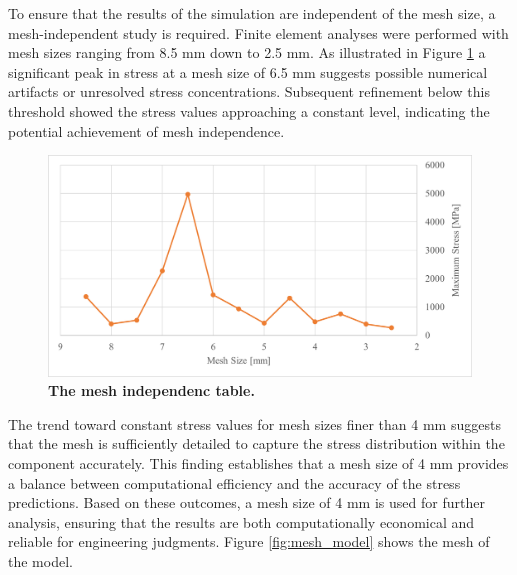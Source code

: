 To ensure that the results of the simulation are independent of the mesh size, a mesh-independent study is required. 
Finite element analyses were performed with mesh sizes ranging from 8.5 mm down to 2.5 mm. As illustrated in 
Figure \ref{fig:mesh_indep} a significant peak in stress at a mesh size of 6.5 mm suggests possible numerical artifacts or 
unresolved stress concentrations. Subsequent refinement below this threshold showed the stress values approaching 
a constant level, indicating the potential achievement of mesh independence.
\begin{figure}[H] %
    \centering
    \captionsetup{labelsep=colon}
    \includegraphics[width=1.0\textwidth]{Image/Design/mesh_independence.png} 
    \caption[The mesh independenc table]
    {\centering \textbf{The mesh independenc table.}}
    \label{fig:mesh_indep}
\end{figure}
The trend toward constant stress values for mesh sizes finer than 4 mm suggests that the mesh is sufficiently 
detailed to capture the stress distribution within the component accurately. This finding establishes that a 
mesh size of 4 mm provides a balance between computational efficiency and the accuracy of the stress predictions. 
Based on these outcomes, a mesh size of 4 mm is used for further analysis, ensuring that the results are both 
computationally economical and reliable for engineering judgments. Figure \ref{fig:mesh_model} shows the mesh 
of the model.
